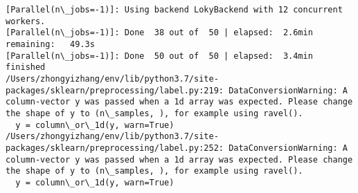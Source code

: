 \documentclass[11pt]{article}
\begin{document}
    \begin{Verbatim}[commandchars=\\\{\}]
[Parallel(n\_jobs=-1)]: Using backend LokyBackend with 12 concurrent workers.
[Parallel(n\_jobs=-1)]: Done  38 out of  50 | elapsed:  2.6min remaining:   49.3s
[Parallel(n\_jobs=-1)]: Done  50 out of  50 | elapsed:  3.4min finished
/Users/zhongyizhang/env/lib/python3.7/site-packages/sklearn/preprocessing/label.py:219: DataConversionWarning: A column-vector y was passed when a 1d array was expected. Please change the shape of y to (n\_samples, ), for example using ravel().
  y = column\_or\_1d(y, warn=True)
/Users/zhongyizhang/env/lib/python3.7/site-packages/sklearn/preprocessing/label.py:252: DataConversionWarning: A column-vector y was passed when a 1d array was expected. Please change the shape of y to (n\_samples, ), for example using ravel().
  y = column\_or\_1d(y, warn=True)

    \end{Verbatim}
\end{document}

